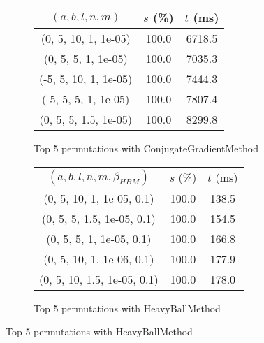 \begin{figure}[H]
\begin{subfigure}[ht]{.5\textwidth}
\begin{tabular}{|c|c|c|}
\hline
\rowcolor{gray!25}
$(a,b,l,n,m)$ & $s$ (\%) & $t$ (ms) \\
\hline
(0, 5, 10, 1, 1e-05) & 100.0 & 6718.5 \\
(0, 5, 5, 1, 1e-05) & 100.0 & 7035.3 \\
(-5, 5, 10, 1, 1e-05) & 100.0 & 7444.3 \\
(-5, 5, 5, 1, 1e-05) & 100.0 & 7807.4 \\
(0, 5, 5, 1.5, 1e-05) & 100.0 & 8299.8 \\
\hline
\end{tabular}
\caption{Top 5 permutations with ConjugateGradientMethod}
\label{subfig:param_comp_NegativeEntropy_ConjugateGradientMethod_UniformSearch}
\end{subfigure}
\hfill
\begin{subfigure}[ht]{.5\textwidth}
\begin{tabular}{|c|c|c|}
\hline
\rowcolor{gray!25}
\multicolumn{3}{|c|}{HeavyBallMethod} \\
\hline
\rowcolor{gray!25}
$(a,b,l,n,m,\beta_{HBM})$ & $s$ (\%) & $t$ (ms) \\
\hline
(0, 5, 10, 1, 1e-05, 0.1) & 100.0 & 138.5 \\
(0, 5, 5, 1.5, 1e-05, 0.1) & 100.0 & 154.5 \\
(0, 5, 5, 1, 1e-05, 0.1) & 100.0 & 166.8 \\
(0, 5, 10, 1, 1e-06, 0.1) & 100.0 & 177.9 \\
(0, 5, 10, 1.5, 1e-05, 0.1) & 100.0 & 178.0 \\
\hline
\end{tabular}
\caption{Top 5 permutations with HeavyBallMethod}
\label{subfig:param_comp_NegativeEntropy_HeavyBallMethod_UniformSearch}
\end{subfigure}
\end{figure}